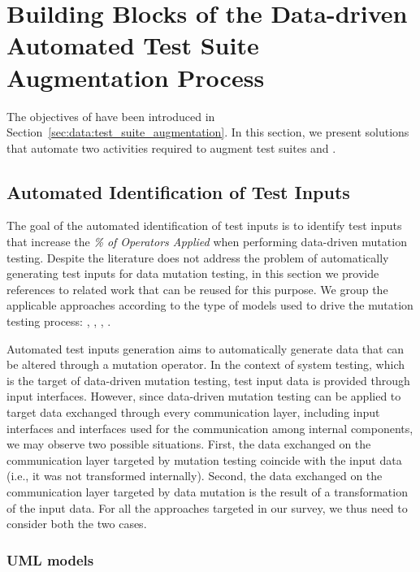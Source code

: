 
\section{Building Blocks of the Data-driven Automated Test Suite Augmentation Process}
\label{sec:testGenerationData}

The objectives of  have been introduced in Section~\ref{sec:data:test_suite_augmentation}.
In this section, we present solutions that automate two activities required to augment test suites
 and .

\subsection{Automated Identification of Test Inputs}

The goal of the automated identification of test inputs is to identify test inputs that increase the \emph{\% of Operators Applied} when performing data-driven mutation testing. Despite the literature does not address the problem of automatically generating test inputs for data mutation testing, in this section we provide references to related work that can be reused for this purpose. We group the applicable approaches according to the type of models used to drive the mutation testing process: , , , . 

Automated test inputs generation aims to automatically generate data that can be altered through a mutation operator. 
In the context of system testing, which is the target of data-driven mutation testing, test input data is provided through input interfaces. However, since data-driven mutation testing can be applied to target data exchanged through 
every communication layer, including input interfaces and interfaces used for the communication among internal components, we may observe two possible situations. First, the data exchanged on the communication layer targeted by mutation testing coincide with the input data (i.e., it was not transformed internally). Second, the data exchanged on the communication layer targeted by data mutation is the result of a transformation of the input data. For all the approaches targeted in our survey, we thus need to consider both the two cases.

\subsubsection{UML models}


